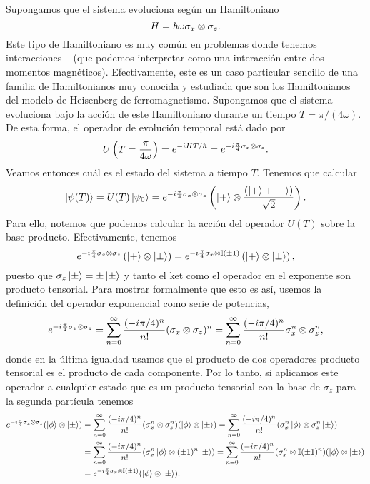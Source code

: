 \documentclass[10pt, a4paper]{article}
\numberwithin{equation}{subsection}
\begin{document}
Supongamos que el sistema evoluciona según un Hamiltoniano
\begin{equation}
  H = \hbar\omega \sigma_x \otimes \sigma_z.
\end{equation}
Este tipo de Hamiltoniano es muy común en problemas donde tenemos interacciones
\spin-\spin~(que podemos interpretar como una interacción entre dos momentos
magnéticos). Efectivamente, este es un caso particular sencillo de una familia
de Hamiltonianos muy conocida y estudiada que son los Hamiltonianos del modelo
de Heisenberg de ferromagnetismo. Supongamos que el sistema evoluciona bajo la
acción de este Hamiltoniano durante un tiempo $T = \pi/(4\omega)$. De esta
forma, el operador de evolución temporal está dado por
\begin{equation}
  U\left(T = \frac{\pi}{4\omega}\right) = e^{-iHT/\hbar} =
    e^{-i\frac{\pi}{4}\sigma_x\otimes\sigma_z}.
\end{equation}
Veamos entonces cuál es el estado del sistema a tiempo $T$. Tenemos que
calcular
\begin{equation}
  \ket{\psi(T)} = U(T)\ket{\psi_0} = 
  e^{-i\frac{\pi}{4}\sigma_x\otimes\sigma_z}
  \left(\ket{+}\otimes\frac{\left(\ket{+} + \ket{-}\right)}{\sqrt{2}}\right).
\end{equation}
Para ello, notemos que podemos calcular la acción del operador $U(T)$ sobre la
base producto. Efectivamente, tenemos
\begin{equation}
  e^{-i\frac{\pi}{4}\sigma_x\otimes\sigma_z}
    \left(\ket{+}\otimes\ket{\pm}\right)
  = e^{-i\frac{\pi}{4}\sigma_x\otimes\mathbb{I}(\pm1)}
    \left(\ket{+}\otimes\ket{\pm}\right),
\end{equation}
puesto que $\sigma_z\ket{\pm} = \pm\ket{\pm}$ y tanto el ket como el operador
en el exponente son producto tensorial. Para mostrar formalmente que esto es
así, usemos la definición del operador exponencial como serie de potencias,
\begin{equation}
  e^{-i\frac{\pi}{4}\sigma_x\otimes\sigma_z}
  = \sum_{n=0}^{\infty} \frac{(-i\pi/4)^n}{n!}(\sigma_x\otimes\sigma_z)^n
  = \sum_{n=0}^{\infty} \frac{(-i\pi/4)^n}{n!}\sigma_x^n\otimes\sigma_z^n,
\end{equation}
donde en la última igualdad usamos que el producto de dos operadores producto
tensorial es el producto de cada componente. Por lo tanto, si aplicamos este
operador a cualquier estado que es un producto tensorial con la base de
$\sigma_z$ para la segunda partícula tenemos
\begin{align}
  e^{-i\frac{\pi}{4}\sigma_x\otimes\sigma_z}(\ket{\phi}\otimes\ket{\pm})
  &= \sum_{n=0}^{\infty} \frac{(-i\pi/4)^n}{n!}
    (\sigma_x^n\otimes\sigma_z^n)(\ket{\phi}\otimes\ket{\pm})
  = \sum_{n=0}^{\infty} \frac{(-i\pi/4)^n}{n!}
    (\sigma_x^n\ket{\phi}\otimes\sigma_z^n\ket{\pm}) \nonumber \\
  &= \sum_{n=0}^{\infty} \frac{(-i\pi/4)^n}{n!}
    (\sigma_x^n\ket{\phi}\otimes(\pm1)^n\ket{\pm})
  = \sum_{n=0}^{\infty} \frac{(-i\pi/4)^n}{n!}
    (\sigma_x^n\otimes\mathbb{I}(\pm1)^n)(\ket{\phi}\otimes\ket{\pm}) \nonumber \\
  &= e^{-i\frac{\pi}{4}\sigma_x\otimes\mathbb{I}(\pm1)}(\ket{\phi}\otimes\ket{\pm}).
\end{align}
\end{document}
